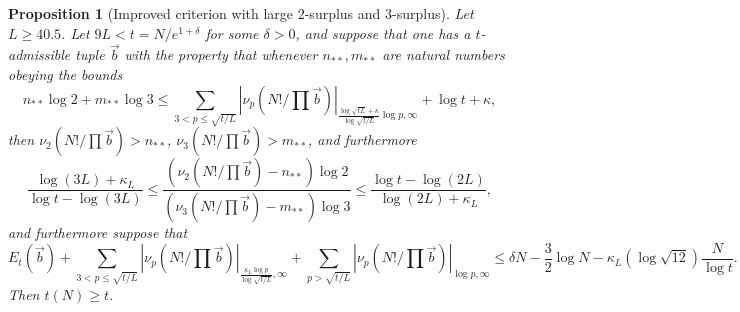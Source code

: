 \documentclass[12pt,a4paper,reqno]{amsart}
\numberwithin{equation}{section}
\theoremstyle{plain}
\newtheorem{proposition}[theorem]{Proposition}
\theoremstyle{definition}
\begin{document}
\begin{proposition}[Improved criterion with large $2$-surplus and $3$-surplus]\label{balance-23'}  Let $L \geq 40.5$.
  Let $9L < t = N/e^{1+\delta}$ for some $\delta>0$, and suppose that one has a $t$-admissible tuple $\vec b$ with the property that whenever $n_{**}, m_{**}$ are natural numbers obeying the bounds
  $$ n_{**} \log 2 + m_{**} \log 3 \leq 
  \sum_{3 < p \leq \sqrt{t/L}}
  |\nu_p(N!/\prod \vec b)|_{\frac{\log \sqrt{tL} + \kappa}{\log\sqrt{t/L}} \log p,\infty}
  + \log t + \kappa,$$
  then $\nu_2(N!/\prod \vec b) > n_{**}$, $\nu_3(N!/\prod \vec b) > m_{**}$, and furthermore
$$
\frac{\log(3L)+\kappa_L}{\log t - \log(3L)} \leq \frac{(\nu_2(N!/\prod \vec b)-n_{**}) \log 2}{(\nu_3(N!/\prod \vec b)-m_{**}) \log 3} \leq \frac{\log t - \log(2L)}{\log(2L)+\kappa_L},
$$
and furthermore suppose that
  \begin{equation}\label{new-balance-4}
      E_t(\vec b) + \sum_{3 < p \leq \sqrt{t/L}}
   |\nu_p(N!/\prod \vec b)|_{\frac{\kappa_L \log p}{\log \sqrt{t/L}},\infty} + 
   \sum_{p>\sqrt{t/L}} |\nu_p(N!/\prod \vec b)|_{\log p,\infty}
   \leq \delta N - \frac{3}{2} \log N - \kappa_L (\log \sqrt{12}) \frac{N}{\log t}.
  \end{equation}
  Then $t(N) \geq t$.
\end{proposition}
\end{document}
